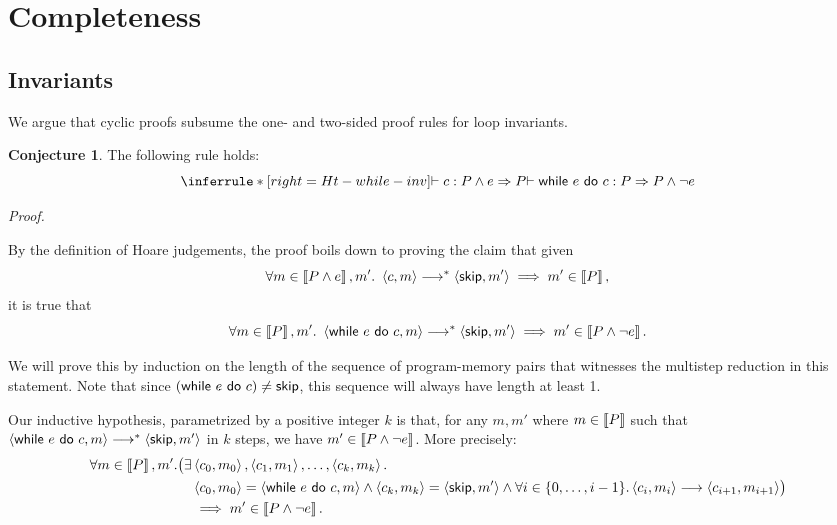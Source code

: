 \documentclass[10pt]{article}
\theoremstyle{definition}
\newtheorem{conjecture}{Conjecture}
\begin{document}
\section{Completeness}

\subsection*{Invariants}

We argue that cyclic proofs subsume the one- and two-sided proof rules for loop invariants.


\begin{conjecture}
The following rule holds:
\begin{displaymath}
    \inferrule*[right=Ht-while-inv]
    { \DER \Triple c : P \wedge e => P }
    { \DER \Triple \While e do c : P => P \wedge \neg e }
\end{displaymath}
\end{conjecture}

\noindent
\emph{Proof.}

\noindent
By the definition of Hoare judgements, the proof boils down to proving 
the claim that given 
\[
    \forall m \in \Interp{P \wedge e}, m'.\
    \Cfg(c, m) \sstepstotrans \Cfg(\Skip, m') 
    \implies m' \in \Interp{P},
\]
it is true that 
\[
    \forall m \in \Interp{P}, m'.\
    \Cfg(\While e do c, m) \sstepstotrans \Cfg(\Skip, m')
    \implies m' \in \Interp{P \wedge \neg e}.
\]

We will prove this by induction on the length of the sequence of program-memory pairs that witnesses 
the multistep reduction in this statement. Note that since $(\While e do c) \neq \Skip$, 
this sequence will always have length at least 1.

Our inductive hypothesis, parametrized by a positive integer $k$ is that, 
for any $m, m'$ where $m \in \left\llbracket P \right\rrbracket$ such that 
$\Cfg(\While e do c, m) \sstepstotrans \Cfg(\Skip, m')$ in $k$ steps, 
we have $m' \in \left\llbracket P \wedge \neg e \right\rrbracket$.
More precisely:
\begin{align*}
    \forall m \in \Interp{P}, m'. 
    \bigl(\exists &\Cfg(c_0, m_0), \Cfg(c_1, m_1), \ldots, \Cfg(c_k, m_k). \\
     &\Cfg(c_0, m_0) = \Cfg(\While e do c, m)
     \wedge \Cfg(c_k, m_k) = \Cfg(\Skip, m') 
     \wedge \forall i \in \{0, \ldots, i-1\}. \Cfg(c_i, m_i) \sstepsto \Cfg(c_{i+1}, m_{i+1}) 
     \bigr) \\
    &\implies m' \in \Interp{P \wedge \neg e}.
\end{align*}
\end{document}
